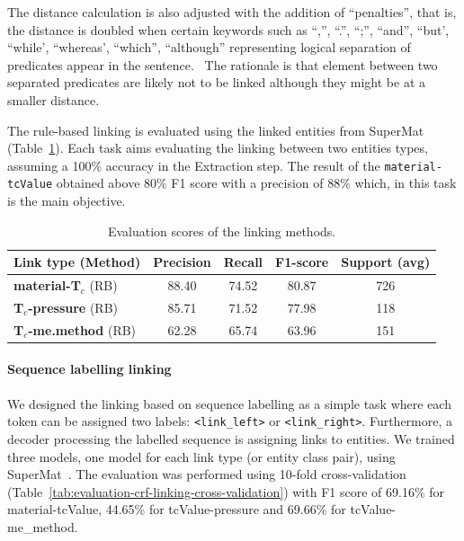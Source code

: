 \documentclass{article}
\newcommand{\tc}{T$_{c}$}
\begin{document}
The distance calculation is also adjusted with the addition of ``penalties'', that is, the distance is doubled when certain keywords such as ``,'', ``.'', ``;'', ``and'', ``but', ``while', ``whereas', ``which'', ``although'' representing logical separation of predicates appear in the sentence.~\cite{oka2021table} The rationale is that element between two separated predicates are likely not to be linked although they might be at a smaller distance. 

The rule-based linking is evaluated using the linked entities from SuperMat~\cite{foppiano2021supermat} (Table~\ref{table:evaluation-linking}). 
Each task aims evaluating the linking between two entities types, assuming a 100\% accuracy in the Extraction step. 
The result of the \texttt{material-tcValue} obtained above 80\% F1 score with a precision of 88\% which, in this task is the main objective.

\begin{table}[ht]
\centering\small
\begin{tabular}{lcccc}
\toprule 
\textbf{Link type} (Method) & \textbf{Precision} & \textbf{Recall} & \textbf{F1-score} & Support (avg) \\ 
\midrule
\textbf{material-\tc} (RB)      &  88.40    & 74.52 &    80.87 &   726  \\
\textbf{\tc-pressure} (RB)      & 85.71  &  71.52  &  77.98  &  118     \\
\textbf{\tc-me.method} (RB)     & 62.28 & 65.74 &  63.96  &  151 \\
\bottomrule
\end{tabular}
\caption{\label{table:evaluation-linking} Evaluation scores of the linking methods. }
\end{table}

\paragraph{Sequence labelling linking} We designed the linking based on sequence labelling as a simple task where each token can be assigned two labels: \texttt{<link\_left>} or \texttt{<link\_right>}. 
Furthermore, a decoder processing the labelled sequence is assigning links to entities.
We trained three models, one model for each link type (or entity class pair), using SuperMat~\cite{foppiano2021supermat}.
The evaluation was performed using 10-fold cross-validation (Table~\ref{tab:evaluation-crf-linking-cross-validation}) with F1 score of 69.16\% for material-tcValue, 44.65\% for tcValue-pressure and 69.66\% for tcValue-me\_method. 
\end{document}
